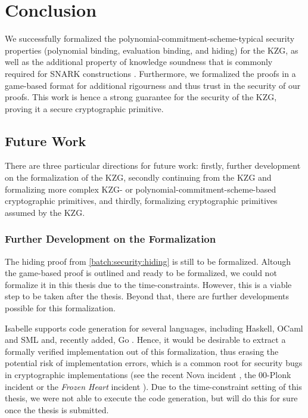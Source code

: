 \chapter{Conclusion}\label{chapter:conclusion}
We successfully formalized the polynomial-commitment-scheme-typical security properties (polynomial binding, evaluation binding, and hiding) for the KZG, as well as the additional property of knowledge soundness that is commonly required for SNARK constructions \parencite{thalerbook,plonk,sonic,halo}. Furthermore, we formalized the proofs in a game-based format for additional rigourness and thus trust in the security of our proofs.
This work is hence a strong guarantee for the security of the KZG, proving it a secure cryptographic primitive.

\section*{Future Work}
There are three particular directions for future work: firstly, further development on the formalization of the KZG, secondly continuing from the KZG and formalizing more complex KZG- or polynomial-commitment-scheme-based cryptographic primitives, and thirdly, formalizing cryptographic primitives assumed by the KZG.

\subsection*{Further Development on the Formalization}
The hiding proof from \ref*{batch:security:hiding} is still to be formalized. Altough the game-based proof is outlined and ready to be formalized, we could not formalize it in this thesis due to the time-constraints. However, this is a viable step to be taken after the thesis. Beyond that, there are further developments possible for this formalization. 

Isabelle supports code generation for several languages, including Haskell, OCaml and SML \parencite{code_gen} and, recently added, Go \parencite{go_codegen}. Hence, it would be desirable to extract a formally verified implementation out of this formalization, thus erasing the potential risk of implementation errors, which is a common root for security bugs in cryptographic implementations (see the recent Nova incident \parencite{nova_bug}, the 00-Plonk incident \parencite{00Plonk} or the \textit{Frozen Heart} incident \parencite{FHPlonk}). Due to the time-constraint setting of this thesis, we were not able to execute the code generation, but will do this for sure once the thesis is submitted.

